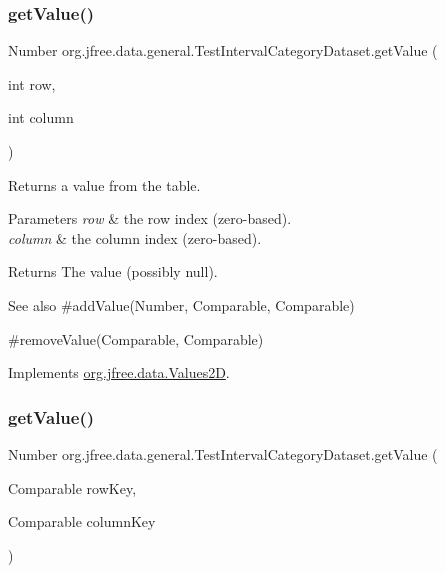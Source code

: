 \subsubsection{\texorpdfstring{get\+Value()}{getValue()}\hspace{0.1cm}{\footnotesize\ttfamily [1/2]}}
{\footnotesize\ttfamily Number org.\+jfree.\+data.\+general.\+Test\+Interval\+Category\+Dataset.\+get\+Value (\begin{DoxyParamCaption}\item[{int}]{row,  }\item[{int}]{column }\end{DoxyParamCaption})}

Returns a value from the table.


\begin{DoxyParams}{Parameters}
{\em row} & the row index (zero-\/based). \\
\hline
{\em column} & the column index (zero-\/based).\\
\hline
\end{DoxyParams}
\begin{DoxyReturn}{Returns}
The value (possibly {\ttfamily null}).
\end{DoxyReturn}
\begin{DoxySeeAlso}{See also}
\#add\+Value(\+Number, Comparable, Comparable) 

\#remove\+Value(\+Comparable, Comparable) 
\end{DoxySeeAlso}


Implements \mbox{\hyperlink{interfaceorg_1_1jfree_1_1data_1_1_values2_d_a0797937d3ac62e18b300eef1fe906ec6}{org.\+jfree.\+data.\+Values2D}}.

\mbox{\label{classorg_1_1jfree_1_1data_1_1general_1_1_test_interval_category_dataset_a0ae7aff04c45ad61c8b0cea8be0b2d1e}} 
\subsubsection{\texorpdfstring{get\+Value()}{getValue()}\hspace{0.1cm}{\footnotesize\ttfamily [2/2]}}
{\footnotesize\ttfamily Number org.\+jfree.\+data.\+general.\+Test\+Interval\+Category\+Dataset.\+get\+Value (\begin{DoxyParamCaption}\item[{Comparable}]{row\+Key,  }\item[{Comparable}]{column\+Key }\end{DoxyParamCaption})}

